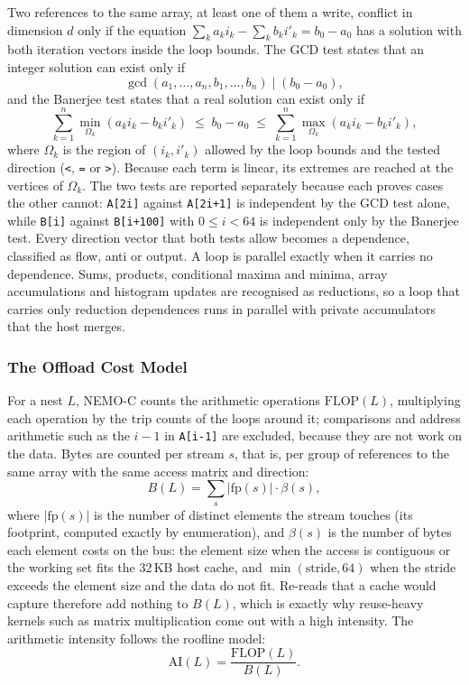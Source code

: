 \documentclass{ieeeaccess}
\begin{document}
Two references to the same array, at least one of them a write, conflict in dimension $d$ only if the equation $\sum_k a_k i_k - \sum_k b_k i'_k = b_0 - a_0$ has a solution with both iteration vectors inside the loop bounds. The GCD test states that an integer solution can exist only if
\begin{equation}
\gcd(a_1,\dots,a_n,b_1,\dots,b_n) \;\big|\; (b_0 - a_0),
\label{eq:gcd}
\end{equation}
and the Banerjee test states that a real solution can exist only if
\begin{equation}
\sum_{k=1}^{n} \min_{\Omega_k}\!\left(a_k i_k - b_k i'_k\right) \;\le\; b_0 - a_0 \;\le\; \sum_{k=1}^{n} \max_{\Omega_k}\!\left(a_k i_k - b_k i'_k\right),
\label{eq:banerjee}
\end{equation}
where $\Omega_k$ is the region of $(i_k,i'_k)$ allowed by the loop bounds and the tested direction (\texttt{<}, \texttt{=} or \texttt{>}). Because each term is linear, its extremes are reached at the vertices of $\Omega_k$. The two tests are reported separately because each proves cases the other cannot: \texttt{A[2i]} against \texttt{A[2i+1]} is independent by the GCD test alone, while \texttt{B[i]} against \texttt{B[i+100]} with $0\le i<64$ is independent only by the Banerjee test. Every direction vector that both tests allow becomes a dependence, classified as flow, anti or output. A loop is parallel exactly when it carries no dependence. Sums, products, conditional maxima and minima, array accumulations and histogram updates are recognised as reductions, so a loop that carries only reduction dependences runs in parallel with private accumulators that the host merges.

\subsubsection{The Offload Cost Model}
For a nest $L$, NEMO-C counts the arithmetic operations $\mathrm{FLOP}(L)$, multiplying each operation by the trip counts of the loops around it; comparisons and address arithmetic such as the $i-1$ in \texttt{A[i-1]} are excluded, because they are not work on the data. Bytes are counted per stream $s$, that is, per group of references to the same array with the same access matrix and direction:
\begin{equation}
B(L) = \sum_{s} |\mathrm{fp}(s)|\cdot\beta(s),
\label{eq:bytes}
\end{equation}
where $|\mathrm{fp}(s)|$ is the number of distinct elements the stream touches (its footprint, computed exactly by enumeration), and $\beta(s)$ is the number of bytes each element costs on the bus: the element size when the access is contiguous or the working set fits the 32\,KB host cache, and $\min(\text{stride},64)$ when the stride exceeds the element size and the data do not fit. Re-reads that a cache would capture therefore add nothing to $B(L)$, which is exactly why reuse-heavy kernels such as matrix multiplication come out with a high intensity. The arithmetic intensity follows the roofline model:
\begin{equation}
\mathrm{AI}(L) = \frac{\mathrm{FLOP}(L)}{B(L)}.
\label{eq:ai}
\end{equation}
\end{document}
